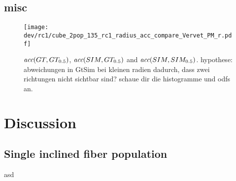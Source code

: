 \subsection{misc}
% 
\begin{figure}[!p]
\centering
\texttt{[image: dev/rc1/cube\_2pop\_135\_rc1\_radius\_acc\_compare\_Vervet\_PM\_r.pdf]}
\caption[sim acc]{ $\textit{acc}{}(GT,GT_{0.5})$, $\textit{acc}{}(SIM,GT_{0.5})$ and $\textit{acc}{}(SIM,SIM_{0.5})$. hypothese: abweichungen in GtSim bei kleinen radien dadurch, dass zwei richtungen nicht sichtbar sind? schaue dir die histogramme und odfs an. }
\label{fig:accVervetPMr}
\end{figure}
% 
% 
% 
\section{Discussion}
% 
\subsection{Single inclined fiber population} 
% 
asd
